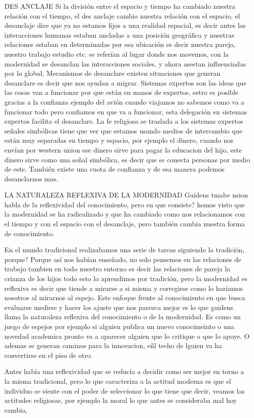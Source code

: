 \documentclass[12pt]{book}
\begin{document}
DES ANCLAJE
Si la división entre el espacio y tiempo ha cambiado nuestra relación con el tiempo, el des anclaje cambio nuestra relación con el espacio, el desanclaje dice que ya no estamos fijos a una realidad espacial, es decir antes las interacciones humanas estaban ancladas a una posición geográfica y nuestras relaciones estaban en determinadas por esa ubicación es decir nuestra pareja, nuestro trabajo estudio etc. se referían al lugar donde nos movemos, con la modernidad se desanclan las interacciones sociales, y ahora asestan influenciadas por lo global, 
Mecanismos de desanclare
existen situaciones que generan desanclare es decir que nos ayudan a migrar.
Sistemas expertos son las ideas que las cosas van a funcionar por que están en manos de expertos, estro es posible  gracias a la  confianza ejemplo del avión cuando viajamos no sabemos como va a funcionar todo pero confiamos en que va a funcionar, esta delegación en sistemas expertos facilita el desanclare.
La fe religiosa se traslada a los sistemas expertos
señales simbólicas tiene que ver que estamos usando medios de intercambio que están muy separadas en tiempo y espacio, por ejemplo el dinero, cuando nos envían por western union  ese dinero sirve para pagar la educacion del hijo, este dinero sirve como una señal simbólica, es decir que se conecta personas por medio de este. También existe una cuota de confianza y de esa manera podemos desanclarnos mas.


LA NATURALEZA REFLEXIVA DE LA MODERNIDAD
Guidens tmabe nsion habla de la reflexividad del conocimiento, pero en que consiste?
hemos visto que la modernidad se ha radicalizado y que ha cambiado como nos relacionamos con el 
tiempo y con el espacio con el desanclaje, pero también cambia nuestra forma de conocimiento.

En el mundo tradicional realizabamos una serie de tareas siguiendo la tradición, porque? Porque así nos habían enseñado,  no solo pensemos en las relaciones de trabajo tambien en todo nuestro entorno es decir las relaciones de pareja la crianza de los hijos todo esto lo aprendimos por tradición, 
pero la modernidad es reflexiva es decir que tiende a mirarse a si misma y corregirse como lo haríamos nosotros al mirarnos al espejo. 
Este enfoque frente al conocimiento en que busca evaluarse medirse y hacer los ajuste que nos parezca mejor es lo que guidens llama la naturaleza reflexiva del conocimiento o de la modernidad.
Es como un juego de espejos por ejemplo si alguien publica un nuevo conocimeinto o una novedad academica pronto va a aparecer alguien que lo critique o que lo apoye.
O ademas se generan caminos para la innovacion, eñl techo de lguien va ha convertirse en el piso de otro.

Antes había una reflexividad que se reducía a decidir como ser mejor en torno a la misma tradicional, pero lo que caracteriza a la actitud moderna es que el individuo se siente con el poder de seleccionar lo que tiene que decir, veamos las actitudes religiosas, por ejemplo la moral lo que antes se consideraba mal hoy cambia, 
\end{document}
